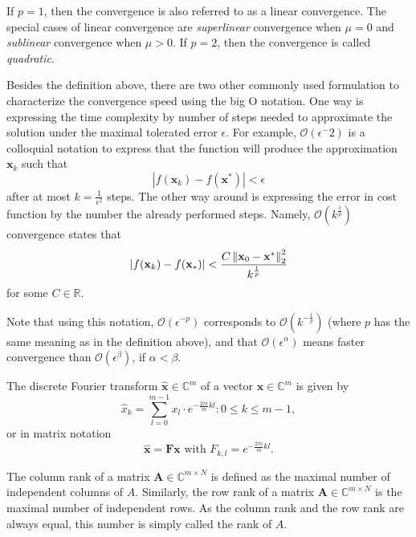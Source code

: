 \begin{tight_equations}
\begin{remark}
If $p = 1$, then the convergence is also referred to as a linear convergence. The special cases of linear convergence are \textit{superlinear} convergence when $\mu = 0$ and \textit{sublinear} convergence when $\mu > 0$. If $p=2$, then the convergence is called \textit{quadratic}.
\end{remark}

\begin{notation}
Besides the definition above, there are two other commonly used formulation to characterize the convergence speed using the big O notation. One way is expressing the time complexity by number of steps needed to approximate the solution under the maximal tolerated error $\epsilon$. For example, $ \mathcal{O}(\epsilon^-2)$ is a colloquial notation to express that the function will produce the approximation $\mathbf{x}_k$ such that 
\[|f(\mathbf{x}_{k}) - f(\mathbf{x}^*)| < \epsilon\]
after at most $k = \frac{1}{\epsilon^2}$ steps. The other way around is expressing the error in cost function by the number the already performed steps. Namely, $\mathcal{O}(k^\frac{1}{p})$ convergence states that
\[|f(\mathbf{x}_k) - f(\mathbf{x}_*)| < \frac{C\left\lVert\mathbf{x}_{0} - \mathbf{x}^*\right\rVert_2^2}{k^\frac{1}{p}}\]
for some $C \in \mathbb{R}$.
\end{notation}

\begin{remark}
Note that using this notation, $\mathcal{O}(\epsilon^{-p})$ corresponds to $\mathcal{O}(k^{-\frac{1}{p}})$ (where $p$ has the same meaning as in the definition above), and that $\mathcal{O}(\epsilon^\alpha)$ means faster convergence than $\mathcal{O}(\epsilon^\beta)$, if $\alpha < \beta$.
\end{remark}

\begin{definition}
The discrete Fourier transform $\mathbf{\hat{x}} \in \mathbb{C}^m$ of a vector $\mathbf{x} \in \mathbb{C}^m$ is given by
\[\hat{x}_k = \sum_{l = 0}^{m-1} x_l \cdot e^{-\frac{2\pi i}{m}kl} : 0 \le k \le m-1,\]
or in matrix notation
\[\mathbf{\hat{x}} = \mathbf{Fx} \text{ with } F_{k,l} = e^{-\frac{2\pi i}{m}kl}.\]
\end{definition}

\begin{definition}
The column rank of a matrix $\mathbf{A} \in \mathbb{C}^{m \times N}$ is defined as the maximal number of independent columns of $A$. Similarly, the row rank of a matrix $\mathbf{A} \in \mathbb{C}^{m \times N}$ is the maximal number of independent rows. As the column rank and the row rank are always equal, this number is simply called the rank of $A$.
\end{definition}


\end{tight_equations}
